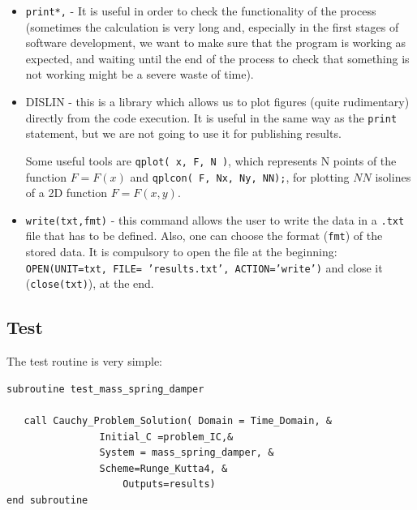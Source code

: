 \begin{itemize}
  \item \texttt{print*,} - It is useful in order to check the functionality of
  the process (sometimes the calculation is very long and, especially in the
  first stages of software development, we want to make sure that the program is
  working as expected, and waiting until the end of the process to check that
  something is not working might be a severe waste of time). \\
  \item DISLIN - this is a library which allows us to plot figures (quite
  rudimentary) directly from the code execution. It is useful in the same way as
  the \texttt{print} statement, but we are not going to use it for publishing
  results.

Some useful tools are \texttt{qplot( x, F, N )}, which represents N points of
the function $F=F(x)$ and \texttt{qplcon( F, Nx, Ny, NN);}, for plotting $NN$
isolines of a 2D function $F=F(x,y)$.\\

  \item \texttt{write(txt,fmt)} - this command allows the user to write the data
  in a \texttt{.txt} file that has to be defined. Also, one can choose
  the format (\texttt{fmt}) of the stored data. It is compulsory to open the
  file at the beginning:  \texttt{OPEN(UNIT=txt, FILE= 'results.txt',
  ACTION='write')} and close it (\texttt{close(txt)}), at the end. \\
  
\end{itemize}







\newpage

\subsection{Test}

The test routine is very simple: 

\begin {blueframed}
\begin{lstlisting}
subroutine test_mass_spring_damper

   call Cauchy_Problem_Solution( Domain = Time_Domain, & 
   				Initial_C =problem_IC,& 
   				System = mass_spring_damper, &
   				Scheme=Runge_Kutta4, &
    				Outputs=results)
end subroutine
\end{lstlisting}
\end{blueframed}

